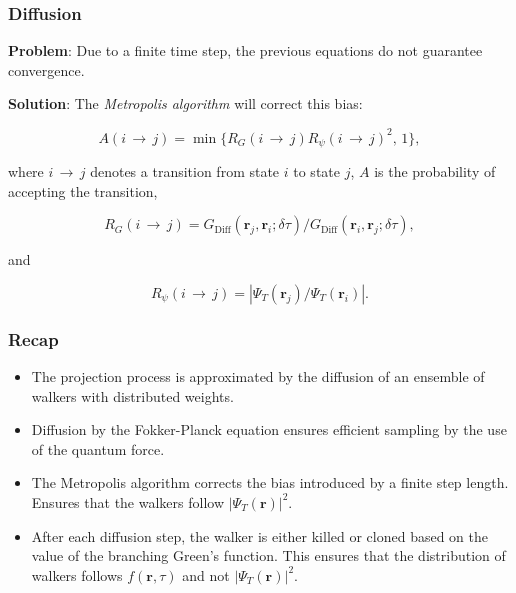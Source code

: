 \begin{frame}
\frametitle{Diffusion}

\textbf{Problem}: Due to a finite time step, the previous equations do not guarantee convergence.  
\shift

\textbf{Solution}: The \textit{Metropolis algorithm} will correct this bias:  

\begin{equation}
  A(i\,\rightarrow\,j) = \min\{R_G(i\,\rightarrow\,j)R_\psi(i\,\rightarrow\,j)^2, \,1\},
\end{equation}

where $i\,\rightarrow\,j$ denotes a transition from state $i$ to state $j$, $A$ is the probability of accepting the transition, 

\begin{equation*}
 R_G(i\,\rightarrow\,j) = G_\mathrm{Diff}(\mathbf{r}_{j}, \mathbf{r}_{i}; \delta\tau)/G_\mathrm{Diff}(\mathbf{r}_{i}, \mathbf{r}_{j}; \delta\tau),
\end{equation*}

and

\begin{equation*}
 R_\psi(i\,\rightarrow\,j) = |\Psi_T(\mathbf{r}_j)/\Psi_T(\mathbf{r}_i)|.
\end{equation*}

\end{frame}



\begin{frame}
 \frametitle{Recap}
 
 \begin{itemize}
 \item The projection process is approximated by the diffusion of an ensemble of walkers with distributed weights.
 \pause \item Diffusion by the Fokker-Planck equation ensures efficient sampling by the use of the quantum force.
 \pause \item The Metropolis algorithm corrects the bias introduced by a finite step length. Ensures that the walkers follow $|\Psi_T(\mathbf{r})|^2$.
 \pause \item After each diffusion step, the walker is either killed or cloned based on the value of the branching Green's function. This ensures that the distribution of walkers follows $f(\mathbf{r}, \tau)$ and not $|\Psi_T(\mathbf{r})|^2$.
 \end{itemize}

\end{frame}


